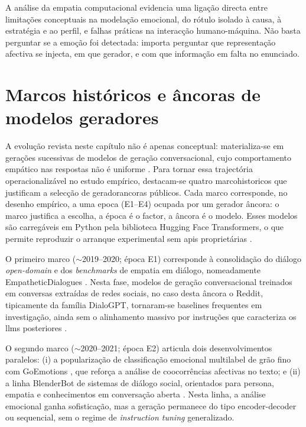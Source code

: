 A análise da empatia computacional evidencia uma ligação directa entre limitações conceptuais na modelação emocional, do rótulo isolado à causa, à estratégia e ao perfil, e falhas práticas na interacção humano-máquina. Não basta perguntar se a emoção foi detectada: importa perguntar que representação afectiva se injecta, em que gerador, e com que informação em falta no enunciado.


\section{Marcos históricos e âncoras de modelos geradores}
\label{sec:marcos_historicos}

A evolução revista neste capítulo não é apenas conceptual: materializa-se em gerações sucessivas de modelos de geração conversacional, cujo comportamento empático nas respostas não é uniforme \parencite{Rashkin2019Empathy, Ou2024DialogBench, Welivita2026HumansOrLLMs}. Para tornar essa trajectória operacionalizável no estudo empírico, destacam-se quatro \glspl{marcohistorico} que justificam a selecção de \glspl{geradorancora} públicos. Cada marco corresponde, no desenho empírico, a uma \gls{epoca} (E1--E4) ocupada por um gerador âncora: o marco justifica a escolha, a época é o factor, a âncora é o modelo. Esses modelos são carregáveis em Python pela biblioteca Hugging Face Transformers, o que permite reproduzir o arranque experimental sem \glspl{api} proprietárias \parencite{Wolf2020Transformers}.

O primeiro marco (\(\sim\)2019--2020; época E1) corresponde à consolidação do diálogo \textit{open-domain} e dos \textit{benchmarks} de empatia em diálogo, nomeadamente EmpatheticDialogues \parencite{Rashkin2019Empathy}. Nesta fase, modelos de geração conversacional treinados em conversas extraídas de redes sociais, no caso desta âncora o Reddit, tipicamente da família DialoGPT, tornaram-se baselines frequentes em investigação, ainda sem o alinhamento massivo por instruções que caracteriza os \glspl{llm} posteriores \parencite{Zhang2020DialoGPT}.

O segundo marco (\(\sim\)2020--2021; época E2) articula dois desenvolvimentos paralelos: (i) a popularização de classificação emocional multilabel de grão fino com GoEmotions \parencite{Demszky2020GoEmotions}, que reforça a análise de coocorrências afectivas no texto; e (ii) a linha BlenderBot de sistemas de diálogo social, orientados para persona, empatia e conhecimentos em conversação aberta \parencite{Roller2021BlenderBot}. Nesta linha, a análise emocional ganha sofisticação, mas a geração permanece do tipo encoder-decoder ou sequencial, sem o regime de \textit{instruction tuning} generalizado.

